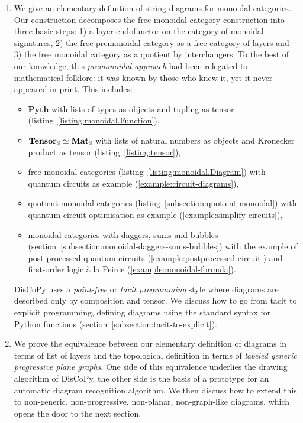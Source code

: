 \begin{enumerate}
\item We give an elementary definition of string diagrams for monoidal categories.
Our construction decomposes the free monoidal category construction into three basic steps: 1) a layer endofunctor on the category of monoidal signatures, 2) the free premonoidal category as a free category of layers and 3) the free monoidal category as a quotient by interchangers.
To the best of our knowledge, this \emph{premonoidal approach} had been relegated to mathematical folklore: it was known by those who knew it, yet it never appeared in print.
This includes:
\begin{itemize}
    \item $\mathbf{Pyth}$ with lists of types as objects and tupling as tensor (listing~\ref{listing:monoidal.Function}),
    \item $\mathbf{Tensor}_\S \simeq \mathbf{Mat}_\S$ with lists of natural numbers as objects and Kronecker product as tensor (listing~\ref{listing:tensor}),
    \item free monoidal categories (listing~\ref{listing:monoidal.Diagram}) with quantum circuits as example (\ref{example:circuit-diagrams}),
    \item quotient monoidal categories (listing~\ref{subsection:quotient-monoidal}) with quantum circuit optimisation as example (\ref{example:simplify-circuits}),
    \item monoidal categories with daggers, sums and bubbles (section~\ref{subsection:monoidal-daggers-sums-bubbles}) with the example of post-processed quantum circuits (\ref{example:postprocessed-circuit}) and first-order logic à la Peirce (\ref{example:monoidal-formula}).
\end{itemize}
DisCoPy uses a \emph{point-free} or \emph{tacit programming} style where diagrams are described only by composition and tensor.
We discuss how to go from tacit to explicit programming, defining diagrams using the standard syntax for Python functions (section~\ref{subsection:tacit-to-explicit}).

\item We prove the equivalence between our elementary definition of diagrams in terms of list of layers and the topological definition in terms of \emph{labeled generic progressive plane graphs}.
One side of this equivalence underlies the drawing algorithm of DisCoPy, the other side is the basis of a prototype for an automatic diagram recognition algorithm.
We then discuss how to extend this to non-generic, non-progressive, non-planar, non-graph-like diagrams, which opens the door to the next section.


\end{enumerate}
